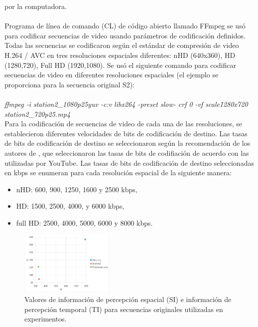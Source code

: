 \documentclass[conference]{IEEEtran}
\begin{document}
    por la computadora.\\
    \\
    Programa de línea de comando (CL) de código abierto llamado 
    FFmpeg se usó para codificar secuencias de video usando 
    parámetros de codificación definidos. Todas las secuencias se 
    codificaron según el estándar de compresión de video H.264 / AVC en 
    tres resoluciones espaciales diferentes: nHD (640x360), HD 
    (1280,720), Full HD (1920,1080). Se usó el siguiente comando para 
    codificar secuencias de video en diferentes resoluciones espaciales 
    (el ejemplo se proporciona para la secuencia original S2):\\
    \\
    \textsl{ffmpeg -i station2\_1080p25yuv -c:v libx264 -preset slow- 
        crf 0 -vf scale\=1280x720 station2\_720p25.mp4}
    \\
    Para la codificación de secuencias de video de cada una de las 
    resoluciones, se establecieron diferentes velocidades de bits de 
    codificación de destino. Las tasas de bits de codificación de destino 
    se seleccionaron según la recomendación de los autores de \cite{biblio21}, que 
    seleccionaron las tasas de bits de codifiación de acuerdo con las 
    utilizadas por YouTube. Las tasas de bits de codificación de destino 
    seleccionadas en kbps se enumeran para cada resolución espacial de 
    la siguiente manera:
    
    \begin{itemize}
        \item nHD: 600, 900, 1250, 1600 y 2500 kbps,
        \item HD: 1500, 2500, 4000, y 6000 kbps,
        \item full HD: 2500, 4000, 5000, 6000 y 8000 kbps.
    \end{itemize}

    \begin{figure}[H]
        \centering
        \includegraphics[width=0.4\textwidth]{img/fig1.png}
        \caption{Valores de información de percepción espacial (SI) e información de 
            percepción temporal (TI) para secuencias originales utilizadas en
            experimentos.}
        \label{figure1}
    \end{figure}
\end{document}
